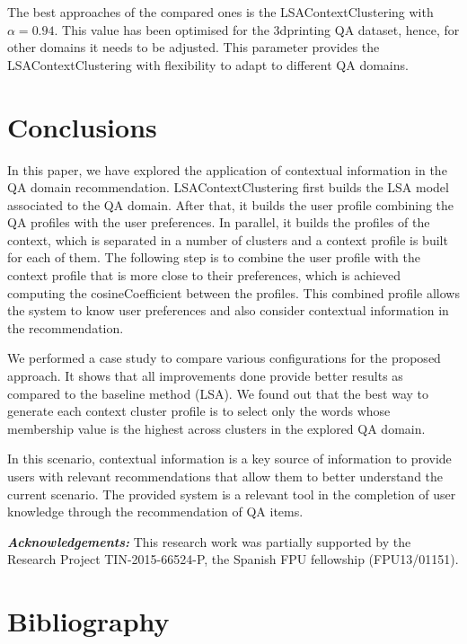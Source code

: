 \documentclass[preprint]{elsarticle}
\begin{document}
\begin{spacing}{1.5}
The best approaches of the compared ones is the LSAContextClustering with $\alpha=0.94$. This value has been optimised for the 3dprinting QA dataset, hence, for other domains it needs to be adjusted. This parameter provides the LSAContextClustering with flexibility to adapt to different QA domains.

\section{Conclusions}
\label{sec:conclusions}

In this paper, we have explored the application of contextual information in the QA domain recommendation. LSAContextClustering first builds the LSA model associated to the QA domain. After that, it builds the user profile combining the QA profiles with the user preferences. In parallel, it builds the profiles of the context, which is separated in a number of clusters and a context profile is built for each of them. The following step is to combine the user profile with the context profile that is more close to their preferences, which is achieved computing the cosineCoefficient between the profiles. This combined profile allows the system to know user preferences and also consider contextual information in the recommendation. 

We performed a case study to compare various configurations for the proposed approach. It shows that all improvements done provide better results as compared to the baseline method (LSA). We found out that the best way to generate each context cluster profile is to select only the words whose membership value is the highest across clusters in the explored QA domain.

In this scenario, contextual information is a key source of information to provide users with relevant recommendations that allow them to better understand the current scenario. The provided system is a relevant tool in the completion of user knowledge through the recommendation of QA items.

\textbf{\textit{Acknowledgements:}} This research work was partially supported by the Research Project TIN-2015-66524-P, the Spanish FPU fellowship (FPU13/01151).

\section*{Bibliography}



\end{spacing}
\end{document}
